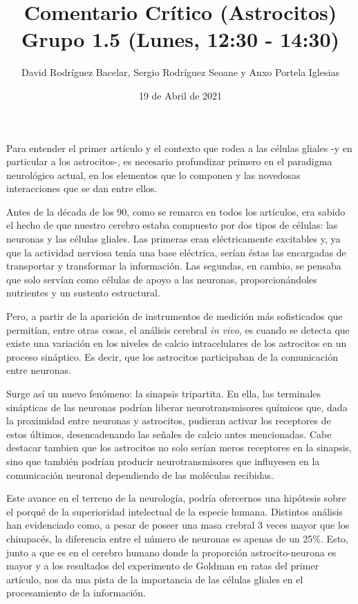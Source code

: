 \documentclass{article}
\title{\textbf{Comentario Crítico (Astrocitos)} \\ \bigskip \large Grupo 1.5 (Lunes, 12:30 - 14:30)}
\author{David Rodríguez Bacelar, Sergio Rodríguez Seoane y Anxo Portela Iglesias}
\date{19 de Abril de 2021}
\begin{document}
\maketitle

Para entender el primer artículo y el contexto que rodea a las células gliales -y en particular a los
astrocitos-, es necesario profundizar primero en el paradigma neurológico actual, en los elementos que lo 
componen y las novedosas interacciones que se dan entre ellos.
\bigskip

\noindent
Antes de la década de los 90, como se remarca en todos los artículos, era sabido el hecho de que nuestro cerebro
estaba compuesto por dos tipos de células: las neuronas y las células gliales. Las primeras eran eléctricamente
excitables y, ya que la actividad nerviosa tenía una base eléctrica, serían éstas las encargadas de transportar
y transformar la información. Las segundas, en cambio, se pensaba que solo servían como células de apoyo a las neuronas,
proporcionándoles nutrientes y un sustento estructural.
\bigskip

\noindent
Pero, a partir de la aparición de instrumentos de medición más sofisticados que permitían, entre otras cosas, el análisis
cerebral \textit{in vivo}, es cuando se detecta que existe una variación en los niveles de calcio intracelulares
de los astrocitos en un proceso sináptico. Es decir, que los astrocitos participaban de la comunicación entre neuronas.
\bigskip

\noindent
Surge así un nuevo fenómeno: la sinapsis tripartita. En ella, las terminales sinápticas de las neuronas
podrían liberar neurotransmisores químicos que, dada la proximidad entre neuronas y astrocitos, pudieran activar los receptores
de estos últimos, desencadenando las señales de calcio antes mencionadas. Cabe destacar tambien que los astrocitos no solo serían meros receptores
en la sinapsis, sino que también podrían producir neurotransmisores que influyesen en la comunicación neuronal dependiendo de las moléculas
recibidas.

\newpage
Este avance en el terreno de la neurología, podría ofercernos una hipótesis sobre el porqué de la superioridad
intelectual de la especie humana. Distintos análisis han evidenciado como, a pesar de poseer una masa crebral 3 veces mayor
que los chimpacés, la diferencia entre el número de neuronas es apenas de un 25\%. Esto, junto a que es en el cerebro humano donde
la proporción astrocito-neurona es mayor y a los resultados del experimento de Goldman en ratas del primer artículo,
nos da una pista de la importancia de las células gliales en el procesamiento de la información.
\end{document}

